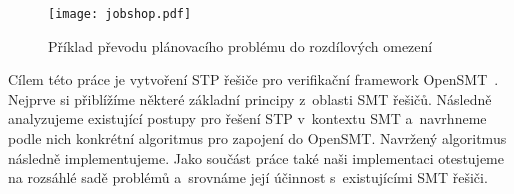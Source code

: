 \begin{figure}[b]
	\centering
	\texttt{[image: jobshop.pdf]}
	\caption{Příklad převodu plánovacího problému do rozdílových omezení} 
	\label{fig:job}
\end{figure}

Cílem této práce je vytvoření STP řešiče pro verifikační framework OpenSMT~\cite{OpenSMT}. Nejprve si přiblížíme některé základní principy z~oblasti SMT řešičů. Následně analyzujeme existující postupy pro řešení STP v~kontextu SMT a~navrhneme podle nich konkrétní algoritmus pro zapojení do OpenSMT. Navržený algoritmus následně implementujeme. Jako součást práce také naši implementaci otestujeme na rozsáhlé sadě problémů a~srovnáme její účinnost s~existujícími SMT řešiči.
